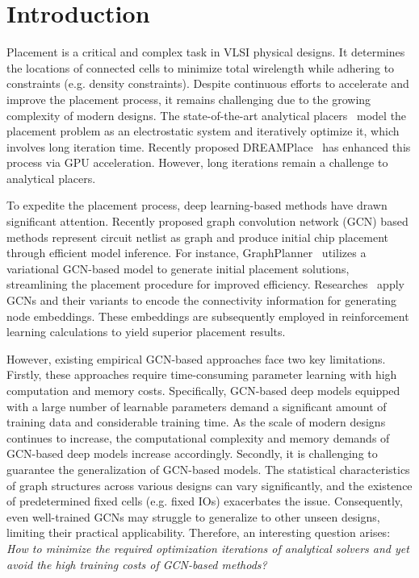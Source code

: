 \section{Introduction}

Placement is a critical and complex task in VLSI physical designs. It determines the locations of connected cells to minimize total wirelength while adhering to constraints (e.g. density constraints).
Despite continuous efforts to accelerate and improve the placement process, it remains challenging due to the growing complexity of modern designs.
The state-of-the-art analytical placers~\cite{2015eplace, replace} model the placement problem as an electrostatic system and iteratively optimize it, which involves long iteration time.
Recently proposed DREAMPlace~\cite{dreamplace3} has enhanced this process via GPU acceleration. However, long iterations remain a challenge to analytical placers. 

To expedite the placement process, deep learning-based methods have drawn significant attention.
Recently proposed graph convolution network (GCN) based methods represent circuit netlist as graph and produce initial chip placement through efficient model inference. For instance, GraphPlanner~\cite{graphplanner} utilizes a variational GCN-based model to generate initial placement solutions, streamlining the placement procedure for improved efficiency. Researches~\cite{CY2021, google21} apply GCNs and their variants to encode the connectivity information for generating node embeddings. These embeddings are subsequently employed in reinforcement learning calculations to yield superior placement results.


However, existing empirical GCN-based approaches face two key limitations. 
Firstly, these approaches require time-consuming parameter learning with high computation and memory costs.  
Specifically, GCN-based deep models equipped with a large number of learnable parameters demand a significant amount of training data and considerable training time. As the scale of modern designs continues to increase, the computational complexity and memory demands of GCN-based deep models increase accordingly.  
Secondly, it is challenging to guarantee the generalization of GCN-based models. The statistical characteristics of graph structures across various designs can vary significantly, and the existence of predetermined fixed cells (e.g. fixed IOs) exacerbates the issue. Consequently, even well-trained GCNs may struggle to generalize to other unseen designs, limiting their practical applicability. 
Therefore, an interesting question arises: \emph{How to minimize the required optimization iterations of analytical solvers and yet avoid the high training costs of GCN-based methods? }



